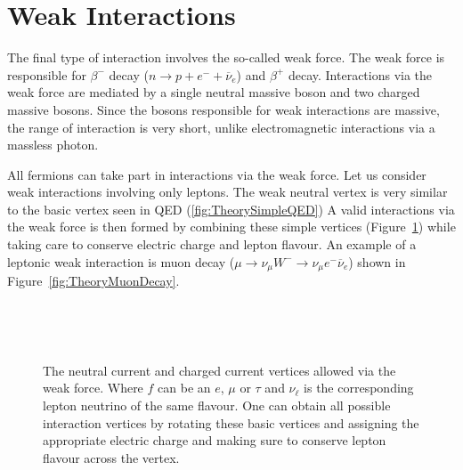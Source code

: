 \section{Weak Interactions} \label{sec:TheoryWeakInteractions}

The final type of interaction involves the so-called weak force. The weak force is responsible for $\beta^{-}$ decay ($n\rightarrow p +e^{-}+\overline{\nu}_{e}$) and $\beta^{+}$ decay. Interactions via the weak force are mediated by a single neutral massive boson and two charged massive bosons. Since the bosons responsible for weak interactions are massive, the range of interaction is very short, unlike electromagnetic interactions via a massless photon.

All fermions can take part in interactions via the weak force. Let us consider weak interactions involving only leptons. The weak neutral vertex is very similar to the basic vertex seen in QED (\ref{fig:TheorySimpleQED}) A valid interactions via the weak force is then formed by combining these simple vertices (Figure~\ref{fig:TheoryWeakVertexes}) while taking care to conserve electric charge and lepton flavour. An example of a leptonic weak interaction is muon decay ($\mu\rightarrow \nu_{\mu}W^{-}\rightarrow \nu_{\mu}e^{-}\overline{\nu}_{e}$) shown in Figure~\ref{fig:TheoryMuonDecay}.

\begin{figure}
  \begin{minipage}[][][t]{.32\textwidth}
    \centering
    
     \label{fig:TheoryWeakNeutralFermions}
  \end{minipage}
  \,
  \begin{minipage}[][][t]{.32\textwidth}
    \centering
    
     \label{fig:TheoryWeakChargedLeptons}
  \end{minipage}
  \,
  \begin{minipage}[][][t]{.32\textwidth}
    \centering
    
     \label{fig:TheoryWeakChargedQuarks}
  \end{minipage}

  \caption{The neutral current and charged current vertices allowed via the weak force. Where $f$ can be an $e$, $\mu$ or $\tau$ and $\nu_{\ell}$ is the corresponding lepton neutrino of the same flavour. 
  One can obtain all possible interaction vertices by rotating these basic vertices and assigning the appropriate electric charge and making sure to conserve lepton flavour across the vertex.} \label{fig:TheoryWeakVertexes}
\end{figure}

